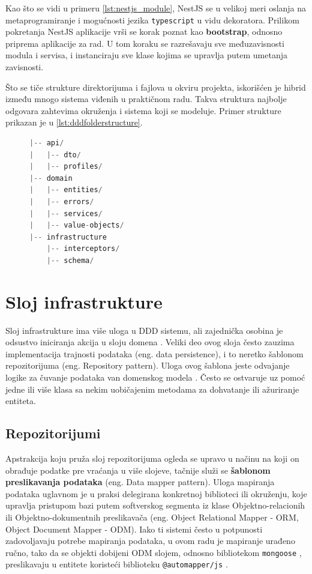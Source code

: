 \documentclass[12pt,oneside]{memoir}
\begin{document}
Kao što se vidi u primeru \ref{lst:nestjs_module}, NestJS se u velikoj meri oslanja na metaprogramiranje i mogućnosti jezika \verb|typescript| u vidu dekoratora. Prilikom pokretanja NestJS aplikacije vrši se korak poznat kao \textbf{bootstrap}, odnosno priprema aplikacije za rad. U tom koraku se razrešavaju sve međuzavisnosti modula i servisa, i instanciraju sve klase kojima se upravlja putem umetanja zavisnosti.

Što se tiče strukture direktorijuma i fajlova u okviru projekta, iskorišćen je hibrid između mnogo sistema viđenih u praktičnom radu. Takva struktura najbolje odgovara zahtevima okruženja i sistema koji se modeluje. Primer strukture prikazan je u \ref{lst:dddfolderstructure}.

\begin{figure}[h]
\begin{lstlisting}[language=JavaScript, style=ES6, caption={fajl tickets.module.ts},label={lst:dddfolderstructure}]
|-- api/
|   |-- dto/
|   |-- profiles/
|-- domain
|   |-- entities/
|   |-- errors/
|   |-- services/
|   |-- value-objects/
|-- infrastructure
    |-- interceptors/
    |-- schema/
\end{lstlisting}
\end{figure}

\section{Sloj infrastrukture}
\label{sec:layer_infra}

Sloj infrastrukture ima više uloga u DDD sistemu, ali zajednička osobina je odsustvo iniciranja akcija u sloju domena \cite{dddfull}. Veliki deo ovog sloja često zauzima implementacija trajnosti podataka (eng. data persistence), i to neretko šablonom repozitorijuma (eng. Repository pattern). Uloga ovog šablona jeste odvajanje logike za čuvanje podataka van domenskog modela \cite{msrepository}. Često se ostvaruje uz pomoć jedne ili više klasa sa nekim uobičajenim metodama za dohvatanje ili ažuriranje entiteta.


\subsection{Repozitorijumi}
Apstrakcija koju pruža sloj repozitorijuma ogleda se upravo u načinu na koji on obrađuje podatke pre vraćanja u više slojeve, tačnije služi se \textbf{šablonom preslikavanja podataka} (eng. Data mapper pattern). Uloga mapiranja podataka uglavnom je u praksi delegirana konkretnoj biblioteci ili okruženju, koje upravlja pristupom bazi putem softverskog segmenta iz klase Objektno-relacionih ili Objektno-dokumentnih preslikavača (eng. Object Relational Mapper - ORM, Object Document Mapper - ODM). Iako ti sistemi često u potpunosti zadovoljavaju potrebe mapiranja podataka, u ovom radu je mapiranje urađeno ručno, tako da se objekti dobijeni ODM slojem, odnosno bibliotekom \verb|mongoose| \cite{mongoosedocs}, preslikavaju u entitete koristeći biblioteku \verb|@automapper/js| \cite{automapperjsdocs}.
\end{document}
